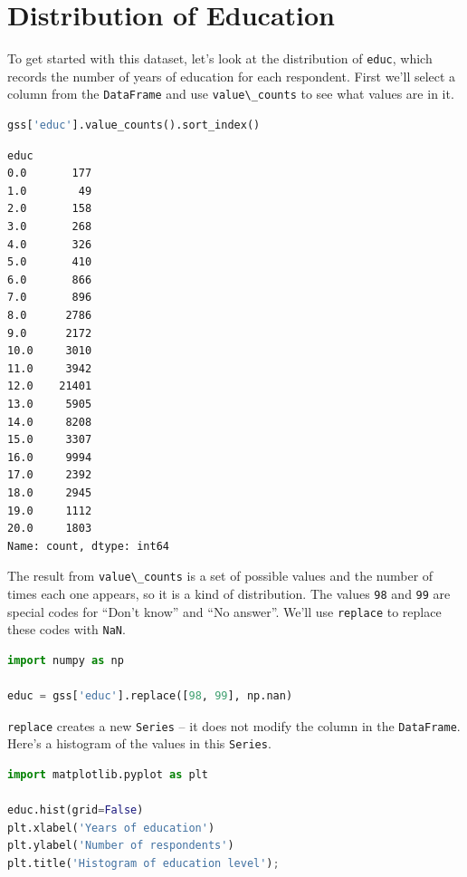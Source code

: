 \hypertarget{distribution-of-education}{%
\section{Distribution of Education}\label{distribution-of-education}}

To get started with this dataset, let's look at the distribution of
\passthrough{\lstinline!educ!}, which records the number of years of
education for each respondent. First we'll select a column from the
\passthrough{\lstinline!DataFrame!} and use
\passthrough{\lstinline!value\_counts!} to see what values are in it.

\begin{lstlisting}[language=Python,style=source]
gss['educ'].value_counts().sort_index()
\end{lstlisting}

\begin{lstlisting}[style=output]
educ
0.0       177
1.0        49
2.0       158
3.0       268
4.0       326
5.0       410
6.0       866
7.0       896
8.0      2786
9.0      2172
10.0     3010
11.0     3942
12.0    21401
13.0     5905
14.0     8208
15.0     3307
16.0     9994
17.0     2392
18.0     2945
19.0     1112
20.0     1803
Name: count, dtype: int64
\end{lstlisting}

The result from \passthrough{\lstinline!value\_counts!} is a set of
possible values and the number of times each one appears, so it is a
kind of distribution. The values \passthrough{\lstinline!98!} and
\passthrough{\lstinline!99!} are special codes for ``Don't know'' and
``No answer''. We'll use \passthrough{\lstinline!replace!} to replace
these codes with \passthrough{\lstinline!NaN!}.

\begin{lstlisting}[language=Python,style=source]
import numpy as np

educ = gss['educ'].replace([98, 99], np.nan)
\end{lstlisting}

\passthrough{\lstinline!replace!} creates a new
\passthrough{\lstinline!Series!} -- it does not modify the column in the
\passthrough{\lstinline!DataFrame!}. Here's a histogram of the values in
this \passthrough{\lstinline!Series!}.

\begin{lstlisting}[language=Python,style=source]
import matplotlib.pyplot as plt

educ.hist(grid=False)
plt.xlabel('Years of education')
plt.ylabel('Number of respondents')
plt.title('Histogram of education level');
\end{lstlisting}

